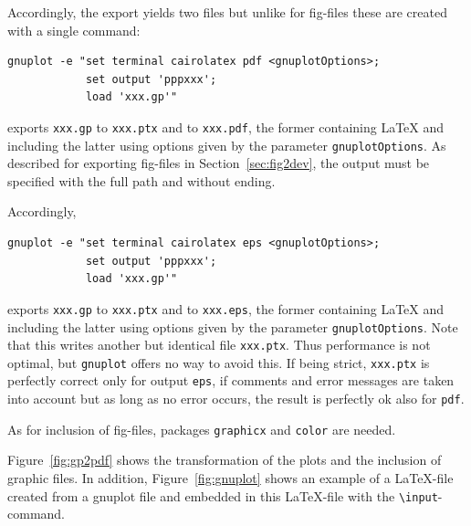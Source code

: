 \documentclass[12pt]{book}
\begin{document}
Accordingly, the export yields two files 
but unlike for fig-files these are created with a single command: 
%
\begin{verbatim}
gnuplot -e "set terminal cairolatex pdf <gnuplotOptions>;
            set output 'pppxxx';
            load 'xxx.gp'"
\end{verbatim}
%
exports {\tt xxx.gp} to {\tt xxx.ptx} and to {\tt xxx.pdf}, 
the former containing \LaTeX{} and including the latter 
using options given by the parameter {\tt gnuplotOptions}. 
As described for exporting fig-files in Section~\ref{sec:fig2dev}, 
the output must be specified with the full path and without ending. 

Accordingly, 
%
\begin{verbatim}
gnuplot -e "set terminal cairolatex eps <gnuplotOptions>;
            set output 'pppxxx';
            load 'xxx.gp'"
\end{verbatim}
%
exports {\tt xxx.gp} to {\tt xxx.ptx} and to {\tt xxx.eps}, 
the former containing \LaTeX{} and including the latter 
using options given by the parameter {\tt gnuplotOptions}. 
Note that this writes another but identical file {\tt xxx.ptx}. 
Thus performance is not optimal, but {\tt gnuplot} offers no way to avoid this. 
If being strict, {\tt xxx.ptx} is perfectly correct only for output {\tt eps}, 
if comments and error messages are taken into account 
but as long as no error occurs, the result is perfectly ok also for {\tt pdf}. 

As for inclusion of fig-files, 
packages {\tt graphicx} and {\tt color} are needed. 



Figure~\ref{fig:gp2pdf} shows the transformation of the plots 
and the inclusion of graphic files. 
In addition, Figure~\ref{fig:gnuplot} shows an example of a \LaTeX-file 
created from a gnuplot file 
and embedded in this \LaTeX-file with the {\tt\textbackslash input}-command. 
\end{document}

